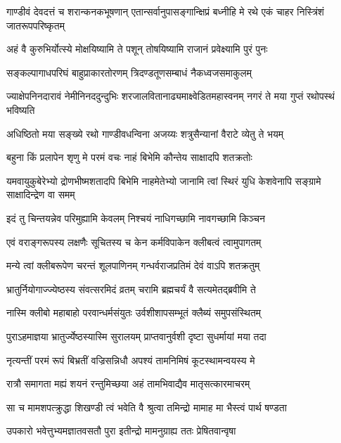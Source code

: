 \threelineshloka
{गाण्डीवं देवदत्तं च शरान्कनकभूषणान्}
{एतान्सर्वानुपासङ्गान्क्षिप्रं बध्नीहि मे रथे}
{एकं चाहर निस्त्रिंशं जातरूपपरिष्कृतम्}


\twolineshloka
{अहं वै कुरुभिर्योत्स्ये मोक्षयिष्यामि ते पशून्}
{तोषयिष्यामि राजानं प्रवेक्ष्यामि पुरं पुनः}


\twolineshloka
{सङ्कल्पागाधपरिघं बाहुप्राकारतोरणम्}
{त्रिदण्डतूणसम्बाधं नैकध्वजसमाकुलम्}


\threelineshloka
{ज्याक्षेपनिनदारावं नेमीनिनददुन्दुभिः}
{शरजालवितानाढ्यमाक्ष्वेडितमहास्वनम्}
{नगरं ते मया गुप्तं रथोपस्थं भविष्यति}


\twolineshloka
{अधिष्ठितो मया सङ्ख्ये रथो गाण्डीवधन्विना}
{अजय्यः शत्रुसैन्यानां वैराटे व्येतु ते भयम्}




\twolineshloka
{बहुना किं प्रलापेन शृणु मे परमं वचः}
{नाहं बिभेमि कौन्तेय साक्षादपि शतक्रतोः}


\threelineshloka
{यमवायुकुबेरेभ्यो द्रोणभीष्मशतादपि}
{बिभेमि नाहमेतेभ्यो जानामि त्वां स्थिरं युधि}
{केशवेनापि सङ्ग्रामे साक्षादिन्द्रेण वा समम्}


\twolineshloka
{इदं तु चिन्तयन्नेव परिमुह्यामि केवलम्}
{निश्चयं नाधिगच्छामि नावगच्छामि किञ्चन}


\twolineshloka
{एवं वराङ्गरूपस्य लक्षणैः सूचितस्य च}
{केन कर्मविपाकेन क्लीबत्वं त्वामुपागतम्}


\twolineshloka
{मन्ये त्वां क्लीबरूपेण चरन्तं शूलपाणिनम्}
{गन्धर्वराजप्रतिमं देवं वाऽपि शतक्रतुम्}




\twolineshloka
{भ्रातुर्नियोगाज्ज्येष्ठस्य संवत्सरमिदं व्रतम्}
{चरामि ब्रह्मचर्यं वै सत्यमेतद्ब्रवीमि ते}


\twolineshloka
{नास्मि क्लीबो महाबाहो परवान्धर्मसंयुतः}
{उर्वशीशापसम्भूतं क्लैब्यं समुपसंस्थितम्}


\twolineshloka
{पुराऽहमाज्ञया भ्रातुर्ज्येष्ठस्यास्मि सुरालयम्}
{प्राप्तवानुर्वशी दृष्टा सुधर्मायां मया तदा}


\twolineshloka
{नृत्यन्तीं परमं रूपं बिभ्रतीं वज्रिसन्निधौ}
{अपश्यं तामनिमिषं कूटस्थामन्वयस्य मे}


\twolineshloka
{रात्रौ समागता मह्यं शयनं रन्तुमिच्छया}
{अहं तामभिवाद्यैव मातृसत्कारमाचरम्}


\twolineshloka
{सा च मामशपत्क्रुद्धा शिखण्डी त्वं भवेति वै}
{श्रुत्वा तमिन्द्रो मामाह मा भैस्त्वं पार्थ षण्डता}


\twolineshloka
{उपकारो भवेत्तुभ्यमज्ञातवसतौ पुरा}
{इतीन्द्रो मामनुग्राह्य ततः प्रेषितवान्वृषा}


